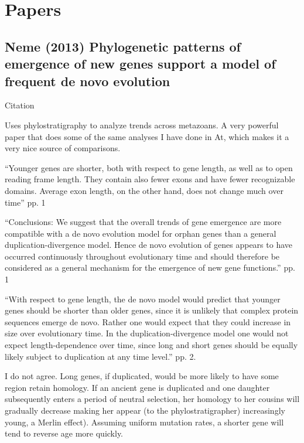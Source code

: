 \section{Papers}
\subsection{Neme (2013) Phylogenetic patterns of emergence of new genes
support a model of frequent de novo evolution}

    Citation \cite{neme_phylogenetic_2013}

    Uses phylostratigraphy to analyze trends across metazoans. A very
    powerful paper that does some of the same analyses I have done in At,
    which makes it a very nice source of comparisons.

    ``Younger genes are shorter, both with respect to gene length, as well
    as to open reading frame length. They contain also fewer exons and have
    fewer recognizable domains. Average exon length, on the other hand,
    does not change much over time'' pp. 1

    ``Conclusions: We suggest that the overall trends of gene emergence are
    more compatible with a de novo evolution model for orphan genes than a
    general duplication-divergence model. Hence de novo evolution of genes
    appears to have occurred continuously throughout evolutionary time and
    should therefore be considered as a general mechanism for the emergence
    of new gene functions.'' pp. 1

    ``With respect to gene length, the de novo model would predict that
    younger genes should be shorter than older genes, since it is unlikely
    that complex protein sequences emerge de novo. Rather one would expect
    that they could increase in size over evolutionary time. In the
    duplication-divergence model one would not expect length-dependence
    over time, since long and short genes should be equally likely subject
    to duplication at any time level.'' pp. 2.
    
    I do not agree. Long genes, if duplicated, would be more likely to have
    some region retain homology. If an ancient gene is duplicated and one
    daughter subsequently enters a period of neutral selection, her
    homology to her cousins will gradually decrease making her appear (to
    the phylostratigrapher) increasingly young, a Merlin effect). Assuming
    uniform mutation rates, a shorter gene will tend to reverse age more
    quickly.

